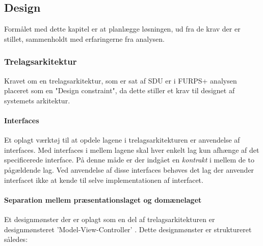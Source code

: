 \subsection{Design}

Formålet med dette kapitel er at planlægge løsningen, ud fra de krav der er
stillet, sammenholdt med erfaringerne fra analysen.


\subsubsection{Trelagsarkitektur}%
\label{ssub:3_lags_arkiteturen}

Kravet om en trelagsarkitektur, som er sat af SDU er i FURPS+ analysen placeret
som en "Design constraint", da dette stiller et krav til designet af systemets
arkitektur. 


\paragraph{Interfaces} Et oplagt værktøj til at opdele lagene i
trelagsarkitekturen er anvendelse af interfaces. Med interfaces i mellem lagene 
skal hver enkelt lag kun afhænge af det specificerede interface. På denne måde
er der indgået en \emph{kontrakt} i mellem de to pågældende lag.
Ved anvendelse af disse interfaces behøves det lag der anvender interfacet ikke
at kende til selve implementationen af interfacet.

\paragraph{Separation mellem præsentationslaget og domænelaget}

Et designmønster der er oplagt som en del af trelagsarkitekturen er
designmønsteret 'Model-View-Controller'\cite[p. 176]{} . Dette designmønster er struktureret
således:

